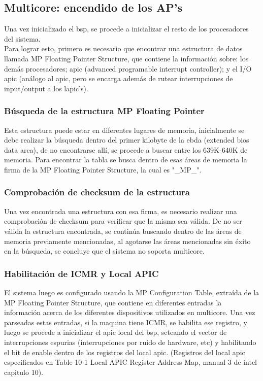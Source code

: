 \subsection{Multicore: encendido de los AP's}

Una vez inicializado el bsp, se procede a inicializar el resto de los procesadores del sistema.\\
Para lograr esto, primero es necesario que encontrar una estructura de datos llamada MP Floating Pointer Structure, que contiene la información sobre: los demás procesadores; apic (advanced programable interrupt controller); y el I/O apic (análogo al apic, pero se encarga además de rutear interrupciones de input/output a los lapic's).

\subsubsection{Búsqueda de la estructura MP Floating Pointer}
Esta estructura puede estar en diferentes lugares de memoria, inicialmente se debe realizar la búsqueda dentro del primer kilobyte de la ebda (extended bios data area), de no encontrarse allí, se procede a buscar entre los 639K-640K de memoria.
Para encontrar la tabla se busca dentro de esas áreas de memoria la firma de la MP Floating Pointer Structure, la cual es "\_MP\_".

\subsubsection{Comprobación de checksum de la estructura}
Una vez encontrada una estructura con esa firma, es necesario realizar una comprobación de checksum para verificar que la misma sea válida.
De no ser válida la estructura encontrada, se continúa buscando dentro de las áreas de memoria previamente mencionadas, al agotarse las áreas mencionadas sin éxito en la búsqueda, se concluye que el sistema no soporta multicore.

\subsubsection{Habilitación de ICMR y Local APIC}
El sistema luego es configurado usando la MP Configuration Table, extraída de la MP Floating Pointer Structure, que contiene en diferentes entradas la información acerca de los diferentes dispositivos utilizados en multicore.
Una vez parseadas estas entradas, si la maquina tiene ICMR, se habilita ese registro, y luego se procede a inicializar el apic local del bsp, seteando el vector de interrupciones espurias (interrupciones por ruido de hardware, etc) y habilitando el bit de enable dentro de los registros del local apic. (Registros del local apic especificados en Table 10-1 Local APIC Register Address Map, manual 3 de intel capitulo 10).


